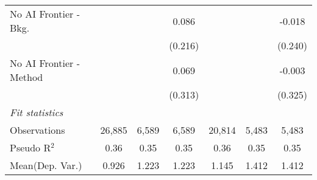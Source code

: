 \begin{tabular}{lcccccc}
   No AI Frontier - Bkg.   &         &         & 0.086   &                &         & -0.018\\   
                           &         &         & (0.216) &                &         & (0.240)\\   
   No AI Frontier - Method &         &         & 0.069   &                &         & -0.003\\   
                           &         &         & (0.313) &                &         & (0.325)\\   
   \midrule
   \emph{Fit statistics}\\
   Observations            & 26,885  & 6,589   & 6,589   & 20,814         & 5,483   & 5,483\\  
   Pseudo R$^2$            & 0.36    & 0.35    & 0.35    & 0.36           & 0.35    & 0.35\\  
Mean(Dep. Var.) & 0.926 & 1.223 & 1.223 & 1.145 & 1.412 & 1.412 \\
   

\end{tabular}

